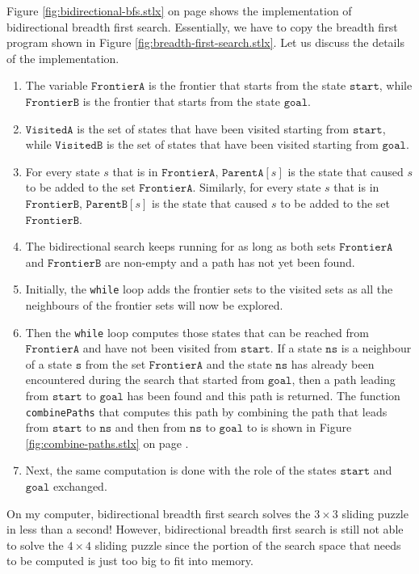 Figure \ref{fig:bidirectional-bfs.stlx} on page \pageref{fig:bidirectional-bfs.stlx} shows the implementation
of bidirectional breadth first search.  Essentially, we have to copy the breadth first program shown in
Figure \ref{fig:breadth-first-search.stlx}. Let us discuss the details of the implementation.
\begin{enumerate}
\item The variable $\mathtt{FrontierA}$ is the frontier that starts from the state $\mathtt{start}$, while
      $\mathtt{FrontierB}$ is the frontier that starts from the state $\mathtt{goal}$.
\item $\mathtt{VisitedA}$ is the set of states that have been visited starting from $\mathtt{start}$, while
      $\mathtt{VisitedB}$ is the set of states that have been visited starting from $\mathtt{goal}$.
\item For every state $s$ that is in $\mathtt{FrontierA}$, $\mathtt{ParentA}[s]$ is the state that caused $s$
      to be added to the set $\mathtt{FrontierA}$.  Similarly, for every state $s$ that is in $\mathtt{FrontierB}$,
      $\mathtt{ParentB}[s]$ is the state that caused $s$ to be added to the set $\mathtt{FrontierB}$.
\item The bidirectional search keeps running for as long as both sets $\mathtt{FrontierA}$ and
      $\mathtt{FrontierB}$ are non-empty and a path has not yet been found.
\item Initially, the \texttt{while} loop adds the frontier sets to the visited sets
      as all the neighbours of the frontier sets will now be explored.
\item Then the \texttt{while} loop computes those states that can be reached from $\mathtt{FrontierA}$ and have not been
      visited from $\mathtt{start}$.  If a state $\mathtt{ns}$ is a neighbour of a state $\mathtt{s}$ from the set
      $\mathtt{FrontierA}$ and the state $\mathtt{ns}$ has already been encountered during the search that started
      from $\mathtt{goal}$, then a path leading from $\mathtt{start}$ to $\mathtt{goal}$ has been found and this path
      is returned.  The function \texttt{combinePaths} that computes this path by combining the path that leads
      from $\mathtt{start}$ to $\mathtt{ns}$ and then from $\mathtt{ns}$ to $\mathtt{goal}$ to is shown in Figure
      \ref{fig:combine-paths.stlx} on page \pageref{fig:combine-paths.stlx}.
\item Next, the same computation is done with the role of the states $\mathtt{start}$ and $\mathtt{goal}$ exchanged.
\end{enumerate}
On my computer, bidirectional breadth first search solves the $3 \times 3$ sliding puzzle in less than a
second!  However, bidirectional breadth first search is still not able to solve the $4 \times 4$ sliding puzzle
since the portion of the search space that needs to be computed is just too big to fit into memory.


